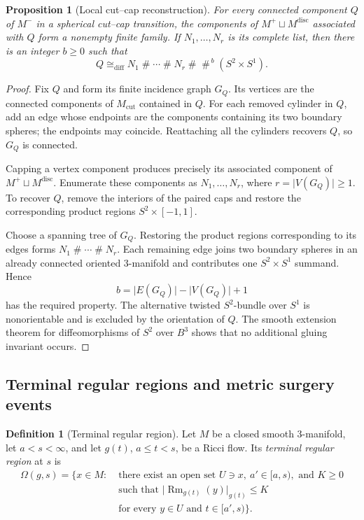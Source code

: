 \documentclass[10pt]{coll-l}
\newcommand{\diffeo}{\mathrel{\cong_{\mathrm{diff}}}}
\newtheorem{proposition}[theorem]{Proposition}
\theoremstyle{definition}
\newtheorem{definition}[theorem]{Definition}
\theoremstyle{remark}
\numberwithin{section}{chapter}
\numberwithin{equation}{chapter}
\newcommand{\Rm}{\operatorname{Rm}}
\begin{document}
\begin{proposition}[Local cut--cap reconstruction]
\label{prop:local-cut-cap-reconstruction}
For every connected component $Q$ of $M^{-}$ in a spherical cut--cap
transition, the components of $M^{+}\sqcup M^{\mathrm{disc}}$ associated
with $Q$ form a nonempty finite family.  If
$N_{1},\ldots,N_{r}$ is its complete list, then there is an integer $b\geq0$
such that
\[
  Q\diffeo
  N_{1}\mathbin{\#}\cdots\mathbin{\#}N_{r}
  \mathbin{\#}
  \mathop{\#}^{\,b}(S^{2}\times S^{1}).
\]
\end{proposition}

\begin{proof}
Fix $Q$ and form its finite incidence graph $G_Q$.  Its vertices are the
connected components of $M_{\mathrm{cut}}$ contained in $Q$.  For each
removed cylinder in $Q$, add an edge whose endpoints are the components
containing its two boundary spheres; the endpoints may coincide.  Reattaching
all the cylinders recovers $Q$, so $G_Q$ is connected.

Capping a vertex component produces precisely its associated component of
$M^{+}\sqcup M^{\mathrm{disc}}$.  Enumerate these components as
$N_1,\ldots,N_r$, where $r=\lvert V(G_Q)\rvert\geq1$.  To recover $Q$, remove
the interiors of the paired caps and restore the corresponding product
regions $S^{2}\times[-1,1]$.

Choose a spanning tree of $G_Q$.  Restoring the product regions
corresponding to its edges forms
$N_1\mathbin{\#}\cdots\mathbin{\#}N_r$.  Each remaining edge joins two
boundary spheres in an already connected oriented $3$-manifold and
contributes one $S^{2}\times S^{1}$ summand.  Hence
\[
  b=\lvert E(G_Q)\rvert-\lvert V(G_Q)\rvert+1
\]
has the required property.  The alternative twisted $S^{2}$-bundle over
$S^{1}$ is nonorientable and is excluded by the orientation of $Q$.  The
smooth extension theorem for diffeomorphisms of $S^{2}$ over $B^{3}$ shows
that no additional gluing invariant occurs.
\end{proof}

\subsection{Terminal regular regions and metric surgery events}

\begin{definition}[Terminal regular region]
\label{def:terminal-regular-region}
Let $M$ be a closed smooth $3$-manifold, let $a<s<\infty$, and let $g(t)$,
$a\leq t<s$, be a Ricci flow.  Its \emph{terminal regular region} at $s$ is
\[
\begin{split}
  \Omega(g,s)=\bigl\{x\in M:\;&\text{there exist an open set }U\ni x,\
  a'\in[a,s),\text{ and }K\geq0\\
  &\text{such that }
  \lvert\Rm_{g(t)}(y)\rvert_{g(t)}\leq K\\
  &\text{for every }y\in U\text{ and }t\in[a',s)\bigr\}.
\end{split}
\]
\end{definition}
\end{document}
